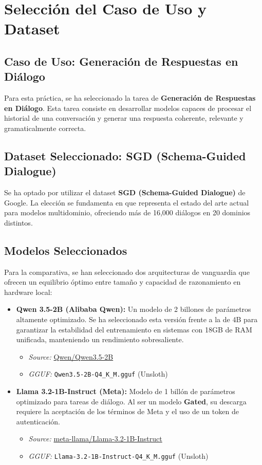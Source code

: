 \section{Selección del Caso de Uso y Dataset}

\subsection{Caso de Uso: Generación de Respuestas en Diálogo}
Para esta práctica, se ha seleccionado la tarea de \textbf{Generación de Respuestas en Diálogo}. Esta tarea consiste en desarrollar modelos capaces de procesar el historial de una conversación y generar una respuesta coherente, relevante y gramaticalmente correcta.

\subsection{Dataset Seleccionado: SGD (Schema-Guided Dialogue)}
Se ha optado por utilizar el dataset \textbf{SGD (Schema-Guided Dialogue)} de Google. La elección se fundamenta en que representa el estado del arte actual para modelos multidominio, ofreciendo más de 16,000 diálogos en 20 dominios distintos.

\subsection{Modelos Seleccionados}
Para la comparativa, se han seleccionado dos arquitecturas de vanguardia que ofrecen un equilibrio óptimo entre tamaño y capacidad de razonamiento en hardware local:

\begin{itemize}
    \item \textbf{Qwen 3.5-2B (Alibaba Qwen):} Un modelo de 2 billones de parámetros altamente optimizado. Se ha seleccionado esta versión frente a la de 4B para garantizar la estabilidad del entrenamiento en sistemas con 18GB de RAM unificada, manteniendo un rendimiento sobresaliente.
    \begin{itemize}
        \item \textit{Source:} \href{https://huggingface.co/Qwen/Qwen3.5-2B}{Qwen/Qwen3.5-2B}
        \item \textit{GGUF:} \texttt{Qwen3.5-2B-Q4\_K\_M.gguf} (Unsloth)
    \end{itemize}
    
    \item \textbf{Llama 3.2-1B-Instruct (Meta):} Modelo de 1 billón de parámetros optimizado para tareas de diálogo. Al ser un modelo \textbf{Gated}, su descarga requiere la aceptación de los términos de Meta y el uso de un token de autenticación.
    \begin{itemize}
        \item \textit{Source:} \href{https://huggingface.co/meta-llama/Llama-3.2-1B-Instruct}{meta-llama/Llama-3.2-1B-Instruct}
        \item \textit{GGUF:} \texttt{Llama-3.2-1B-Instruct-Q4\_K\_M.gguf} (Unsloth)
    \end{itemize}
\end{itemize}

